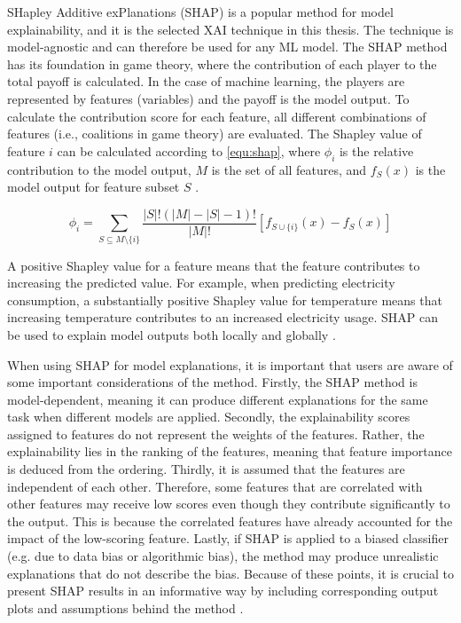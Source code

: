 SHapley Additive exPlanations (SHAP) is a popular method for model explainability, and it is the selected XAI technique in this thesis. The technique is model-agnostic and can therefore be used for any ML model. The SHAP method has its foundation in game theory, where the contribution of each player to the total payoff is calculated. In the case of machine learning, the players are represented by features (variables) and the payoff is the model output. To calculate the contribution score for each feature, all different combinations of features (i.e., coalitions in game theory) are evaluated. The Shapley value of feature $i$ can be calculated according to \autoref{equ:shap}, where $\phi_i$ is the relative contribution to the model output, $M$ is the set of all features, and $f_S(x)$ is the model output for feature subset $S$ %
\cite{salih_perspective_2025,mitchell_gputreeshap_2022}.


\begin{equation}\label{equ:shap}
    \phi_i = \sum_{S \subseteq M \setminus \{i\}}{} \frac{\left| S \right| ! (\left| M \right| - \left| S \right| - 1) !}{\left| M \right| !} [f_{S \cup \{i\}}(x) - f_S(x)]
\end{equation}

A positive Shapley value for a feature means that the feature contributes to increasing the predicted value. For example, when predicting electricity consumption, a substantially positive Shapley value for temperature means that increasing temperature contributes to an increased electricity usage. SHAP can be used to explain model outputs both locally and globally \cite{moon_advancing_2024,salih_perspective_2025}.

When using SHAP for model explanations, it is important that users are aware of some important considerations of the method. Firstly, the SHAP method is model-dependent, meaning it can produce different explanations for the same task when different models are applied. Secondly, the explainability scores assigned to features do not represent the weights of the features. Rather, the explainability lies in the ranking of the features, meaning that feature importance is deduced from the ordering. Thirdly, it is assumed that the features are independent of each other. Therefore, some features that are correlated with other features may receive low scores even though they contribute significantly to the output. This is because the correlated features have already accounted for the impact of the low-scoring feature. Lastly, if SHAP is applied to a biased classifier (e.g. due to data bias or algorithmic bias), the method may produce unrealistic explanations that do not describe the bias. Because of these points, it is crucial to present SHAP results in an informative way by including corresponding output plots and assumptions behind the method \cite{salih_perspective_2025}.

